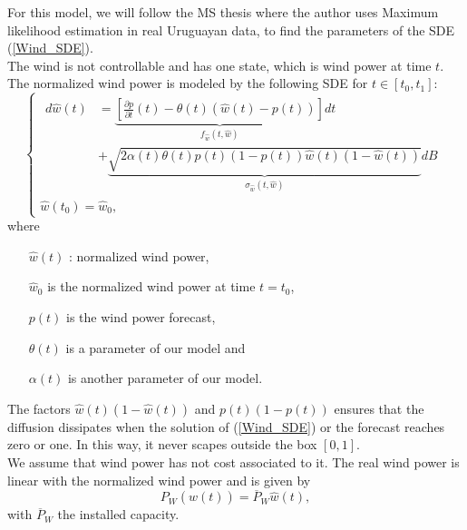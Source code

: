 For this model, we will follow the MS thesis \cite{elkantassi2017probabilistic} where the author uses Maximum likelihood estimation in real Uruguayan data, to find the parameters of the SDE (\ref{Wind_SDE}).\\
The wind is not controllable and has one state, which is wind power at time $t$. %
The normalized wind power is modeled by the following SDE for $t\in[t_0,t_1]$:
\begin{equation}
\begin{cases}
\begin{split}
d\hat{w}(t)&=\underbrace{\left[\frac{\partial p}{\partial t}(t)-\theta(t)(\hat{w}(t)-p(t))\right]}_{f_{\hat{w}}(t,\hat{w})}dt\\
&+\underbrace{\sqrt{2\alpha(t)\theta(t)p(t)(1-p(t))\hat{w}(t)(1-\hat{w}(t))}}_{\sigma_{\hat{w}}(t,\hat{w})}dB
\end{split}\\
\hat{w}(t_0)=\hat{w}_0,
\label{Wind_SDE}
\end{cases}
\end{equation}
where
\begin{enumerate}

\item[$\hat{w}(t)$]: normalized wind power,

\item[$\hat{w}_0$] is the normalized wind power at time $t=t_0$,

\item[$p(t)$] is the wind power forecast,

\item[$\theta(t)$] is a parameter of our model and

\item[$\alpha(t)$] is another parameter of our model.

\end{enumerate}
The factors $\hat{w}(t)(1-\hat{w}(t))$ and $p(t)(1-p(t))$ ensures that the diffusion dissipates when the solution of (\ref{Wind_SDE}) or the forecast reaches zero or one. In this way, it never scapes outside the box $[0,1]$.\\
We assume that wind power has not cost associated to it. The real wind power is linear with the normalized wind power and is given by
\begin{equation*}
P_W(\hat{w}(t))=\overline{P}_W\hat{w}(t),
\label{Wind_Power}
\end{equation*}
with $\overline{P}_W$ the installed capacity.

